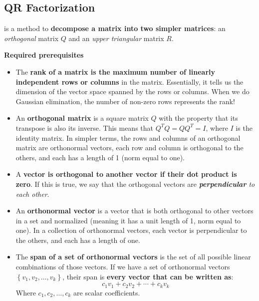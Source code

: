 \subsection{QR Factorization}

 is a method to \textbf{decompose a matrix into two simpler matrices}: an \emph{orthogonal} matrix $Q$ and an \emph{upper triangular} matrix $R$.

\begin{flushleft}
    \textcolor{Red2}{ \textbf{Required prerequisites}}
\end{flushleft}
\begin{itemize}
    \item The \textbf{rank of a matrix is the maximum number of linearly independent rows or columns} in the matrix. Essentially, it tells us the dimension of the vector space spanned by the rows or columns. When we do Gaussian elimination, the number of non-zero rows represents the rank!
    
    \item An \textbf{orthogonal matrix} is a square matrix $Q$ with the property that its transpose is also its inverse. This means that $Q^{T} Q = Q Q^{T} = I$, where $I$ is the identity matrix. In simpler terms, the rows and columns of an orthogonal matrix are orthonormal vectors, each row and column is orthogonal to the others, and each has a length of 1 (norm equal to one).
    
    \item A \textbf{vector is orthogonal to another vector if their dot product is zero}. If this is true, we say that the orthogonal vectors are \emph{\textbf{perpendicular} to each other}.

    \item An \textbf{orthonormal vector} is a vector that is both orthogonal to other vectors in a set and normalized (meaning it has a unit length of 1, norm equal to one). In a collection of orthonormal vectors, each vector is perpendicular to the others, and each has a length of one.

    \item The \textbf{span of a set of orthonormal vectors} is the set of all possible linear combinations of those vectors. If we have a set of orthonormal vectors $\left\{v_{1}, v_{2}, \dots, v_{k}\right\}$, their span is \textbf{every vector that can be written as}:
    \begin{equation*}
        c_{1}v_{1} + c_{2}v_{2} + \cdots + c_{k}v_{k}
    \end{equation*}
    Where $c_{1}, c_{2}, \dots, c_{k}$ are scalar coefficients.
\end{itemize}


